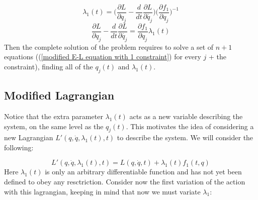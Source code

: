 \documentclass{article}
\begin{document}
\begin{equation*}
    \lambda_1(t) = \bigg( \frac{\partial L}{\partial {q_j}} -\frac{d}{dt}\frac{\partial L}{\partial \dot{q_j}} \bigg)\bigg(\frac{\partial f_1}{\partial q_j}  \bigg)^{-1}
\end{equation*}
\begin{equation}\label{modified E-L equation with 1 constraint}
    \frac{\partial L}{\partial {q_j}} -\frac{d}{dt}\frac{\partial L}{\partial \dot{q_j}}=\frac{\partial f_1}{\partial q_j}\lambda_1(t)
\end{equation}
Then the complete solution of the problem requires to solve a set of $n+1$ equations ((\ref{modified E-L equation with 1 constraint}) for every $j$ + the constraint), finding all of the $q_j(t)$ and $\lambda_1(t)$. 

\subsection{Modified Lagrangian}
Notice that the extra parameter $\lambda_1(t)$ acts as a new variable describing the system, on the same level as the $q_j(t)$.  This motivates the idea of considering a new Lagrangian $L'(q,\dot{q},\lambda_1(t),t)$ to describe the system. We will consider the following:

\begin{equation} \label{modified lagrangian for 1 constraint}
	L'(q,\dot{q},\lambda_1(t),t)= L(q,\dot{q},t) + \lambda_1(t)f_1(t,q)
\end{equation}
Here $\lambda_1(t)$ is only an arbitrary differentiable function and has not yet been defined to obey any resctriction. Consider now the first variation of the action with this lagrangian, keeping in mind that now we must variate $\lambda_1$:
\end{document}

